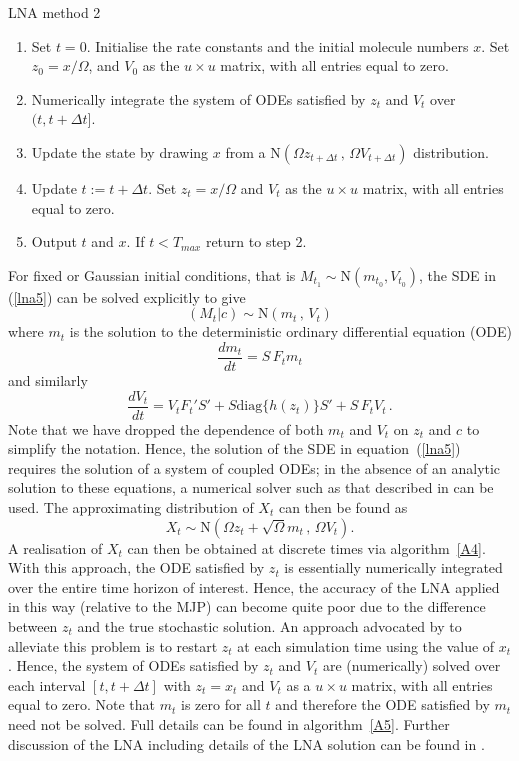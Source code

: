 \documentclass[12pt, DIV12]{scrartcl}
\begin{document}
\begin{algorithm}[t]
\caption{LNA method 2}\label{A5}
\begin{enumerate}
\item Set $t=0$. Initialise the rate constants and the initial molecule numbers
  $x$. Set $z_{0}=x/\Omega$, and $V_{0}$ as the $u\times u$ matrix, with all entries
  equal to zero.
\item Numerically integrate the system of ODEs satisfied by $z_t$ and $V_t$ over
  $(t,t+\Delta t]$.
\item Update the state by drawing $x$ from a $\textrm{N}\left(\Omega z_{t+\Delta
      t}\,,\, \Omega V_{t+\Delta t}\right)$ distribution.
\item Update $t:=t+\Delta t$. Set $z_{t}=x/\Omega$ and $V_{t}$ as the $u\times u$
  matrix, with all entries equal to zero.
\item Output $t$ and $x$. If $t<T_{max}$ return to step 2.
\end{enumerate}
\end{algorithm}  

For fixed or Gaussian initial conditions, that is $M_{t_{1}}\sim
\textrm{N}(m_{t_{0}},V_{t_{0}})$, the SDE in (\ref{lna5}) can be solved
explicitly to give
\[
\left(M_{t}|c\right) \sim \textrm{N}\left(m_{t}\,,\,V_{t}\right)
\] 
where $m_{t}$ is the solution to the deterministic ordinary differential
equation (ODE)
\[
\frac{dm_{t}}{dt} = S\,F_t m_{t}
\]
and similarly
\[
\frac{dV_{t}}{dt} = V_{t}F_{t}'S' + S\textrm{diag}\{h(z_t)\}S' + S\,F_{t}V_{t} \,.
\]
Note that we have dropped the dependence of both $m_{t}$ and $V_{t}$ on $z_{t}$
and $c$ to simplify the notation. Hence, the solution of the SDE in
equation~(\ref{lna5}) requires the solution of a system of coupled ODEs; in the
absence of an analytic solution to these equations, a numerical solver such as
that described in \cite{petzold83} can be used. The approximating distribution
of $X_{t}$ can then be found as
\[
X_{t} \sim \textrm{N}\left(\Omega z_{t}+\sqrt{\Omega}m_{t}\,,\, \Omega V_{t}\right).
\]  
A realisation of $X_t$ can then be obtained at discrete times via
algorithm~\ref{A4}. With this approach, the ODE satisfied by $z_t$ is
essentially numerically integrated over the entire time horizon of interest.
Hence, the accuracy of the LNA applied in this way (relative to the MJP) can
become quite poor due to the difference between $z_t$ and the true stochastic
solution. An approach advocated by \cite{fearnhead12} to alleviate this problem
is to restart $z_t$ at each simulation time using the value of $x_t$. Hence, the
system of ODEs satisfied by $z_t$ and $V_t$ are (numerically) solved over each
interval $[t,t+\Delta t]$ with $z_{t}=x_{t}$ and $V_{t}$ as a $u\times u$
matrix, with all entries equal to zero. Note that $m_{t}$ is zero for all $t$
and therefore the ODE satisfied by $m_t$ need not be solved. Full details can be
found in algorithm~\ref{A5}. Further discussion of the LNA including details of
the LNA solution can be found in \cite{kampen2001,elf03,
  Komorowski09,Wilkinson06}.
\end{document}
